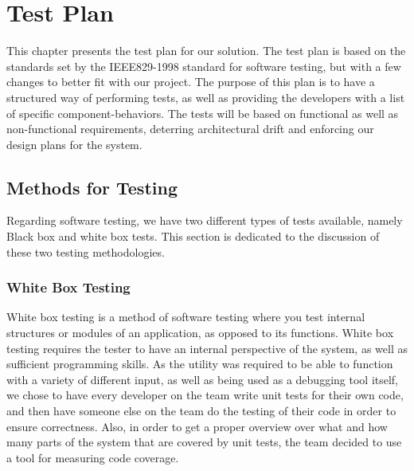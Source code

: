 \chapter{Test Plan}
This chapter presents the test plan for our solution. The test plan is based on
the standards set by the IEEE829-1998 standard for software testing\cite{IEEE829}, but with a
few changes to better fit with our project. The purpose of this plan is to have
a structured way of performing tests, as well as providing the developers with
a list of specific component-behaviors. The tests will be based on functional as
well as non-functional requirements, deterring architectural drift and
enforcing our design plans for the system.


\section{Methods for Testing}
Regarding software testing, we have two different types of tests available, namely Black box and white box tests. This section is dedicated to the discussion of these two testing methodologies.


\subsection{White Box Testing}
White box testing is a method of software testing where you test internal structures or modules of an application, as opposed to its functions. White box testing requires the tester to have an internal perspective of the system, as well as sufficient programming skills. As the \gls{utility} was required to be able to function with a variety of different input, as well as being used as a debugging tool itself, we chose to have every developer on the team write unit tests for their own code, and then have someone else on the team do the testing of their code in order to ensure correctness. Also, in order to get a proper overview over what and how many parts of the system that are covered by unit tests, the team decided to use a tool for measuring code coverage.

